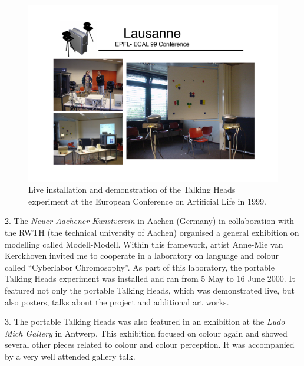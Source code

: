 \begin{figure}[htbp]
  \centerline{\includegraphics[width=.90\textwidth]{chap9/figs/Lausanne.pdf}}
\caption{\label{fig:lausanne}Live installation and demonstration of the Talking Heads experiment at the European Conference on Artificial 
Life in 1999.}
\end{figure}

2. The {\itshape Neuer Aachener Kunstverein} in Aachen (Germany) in collaboration with the 
RWTH (the technical university of Aachen) organised a general exhibition on modelling called 
Modell-Modell. Within this framework, artist Anne-Mie van Kerckhoven invited me to cooperate in a laboratory on 
language and colour called ``Cyberlabor Chromosophy''. As part of this laboratory, the portable Talking Heads 
experiment was installed and ran from 5 May to 16 June 2000. It featured not only the portable Talking Heads, 
which was demonstrated live, but also posters, talks about the project and additional art works. 

3. The portable Talking Heads was also featured in an exhibition at the {\itshape Ludo Mich Gallery} in Antwerp. This 
exhibition focused on colour again and showed several other pieces related to colour and colour perception. 
It was accompanied by a very well attended gallery talk. 

